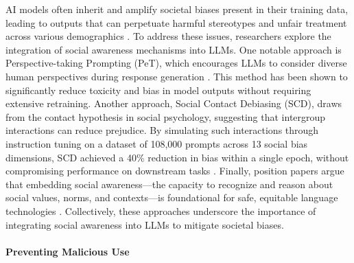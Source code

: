 AI models often inherit and amplify societal biases present in their training data, leading to outputs that can perpetuate harmful stereotypes and unfair treatment across various demographics \cite{gallegos2024bias, rogers2025sora}. To address these issues, researchers explore the integration of social awareness mechanisms into LLMs.
One notable approach is Perspective-taking Prompting (PeT), which encourages LLMs to consider diverse human perspectives during response generation \cite{xu2024walking}. This method has been shown to significantly reduce toxicity and bias in model outputs without requiring extensive retraining. 
Another approach, Social Contact Debiasing (SCD), draws from the contact hypothesis in social psychology, suggesting that intergroup interactions can reduce prejudice. By simulating such interactions through instruction tuning on a dataset of 108,000 prompts across 13 social bias dimensions, SCD achieved a 40\% reduction in bias within a single epoch, without compromising performance on downstream tasks \cite{raj2024breaking}. Finally, position papers argue that embedding social awareness—the capacity to recognize and reason about social values, norms, and contexts—is foundational for safe, equitable language technologies \cite{yang2024call}. Collectively, these approaches underscore the importance of integrating social awareness into LLMs to mitigate societal biases.


\paragraph{Preventing Malicious Use}


